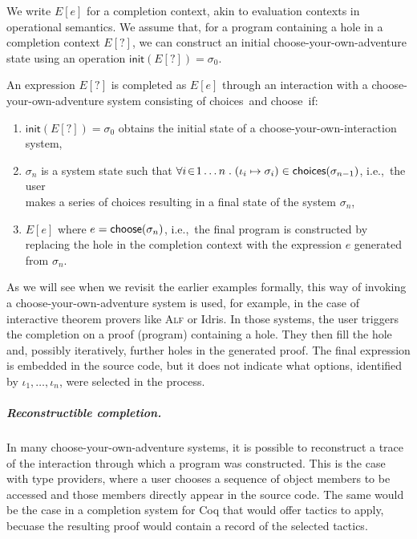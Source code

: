 \documentclass[a4paper,UKenglish,cleveref, autoref, thm-restate]{lipics-v2021}
\newcommand{\ident}[1]{\textsf{#1}}
\newcommand{\sigmaN}{\sigma_0}
\newcommand{\select}{\textnormal{\ident{choose}}}
\newcommand{\choices}{\textnormal{\ident{choices}}}
\begin{document}
We write $E[e]$ for a completion context, akin to evaluation contexts in operational semantics.
We assume that, for a program containing a hole in a completion context $E[?]$, we can construct
an initial choose-your-own-adventure state using an operation $\ident{init}(E[?])=\sigmaN$.

\begin{definition}
An expression $E[?]$ is completed as $E[e]$ through an interaction with
a choose-your-own-adventure system consisting of \choices\ and \select\ if:

\vspace{-0.5em}
\raggedright
\begin{enumerate}
\item $\ident{init}(E[?]) = \sigmaN$ obtains the initial state of a choose-your-own-interaction system,
\item $\sigma_n$ is a system state such that $\forall i\!\in\! 1\ldots n\;.\;(\iota_i\mapsto\sigma_i)\in\choices{(\sigma_{n-1})}$,
  i.e.,~the user\\ makes a series of choices resulting in a final state of the system $\sigma_n$,
\item $E[e]$ where $e=\select(\sigma_n)$, i.e.,~the final program is constructed by replacing the hole
  in the completion context with the expression $e$ generated from $\sigma_n$.
\end{enumerate}
\end{definition}

As we will see when we revisit the earlier examples formally, this way of invoking a choose-your-own-adventure
system is used, for example, in the case of interactive theorem provers like \textsc{Alf} or Idris.
In those systems, the user triggers the completion on a proof (program) containing a hole.
They then fill the hole and, possibly iteratively, further holes in the generated proof. The final
expression is embedded in the source code, but it does not indicate what options, identified by
$\iota_1, \ldots, \iota_n$, were selected in the process.

\subparagraph{Reconstructible completion.}
In many choose-your-own-adventure systems, it is possible to reconstruct a trace of the interaction
through which a program was constructed. This is the case with type providers, where a user chooses
a sequence of object members to be accessed and those members directly appear in the source code.
The same would be the case in a completion system for Coq that would offer tactics to apply,
becuase the resulting proof would contain a record of the selected tactics.
\end{document}
